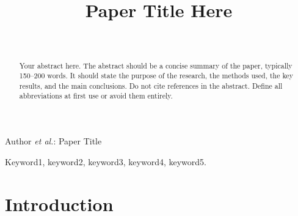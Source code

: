 \documentclass[journal]{IEEEtran}
\begin{document}
\title{Paper Title Here}

\author{%
  \\
}

%
{Author \MakeLowercase{\textit{et al.}}: Paper Title}

\maketitle

\begin{abstract}
Your abstract here. The abstract should be a concise summary of the
paper, typically 150--200 words. It should state the purpose of the
research, the methods used, the key results, and the main conclusions.
Do not cite references in the abstract. Define all abbreviations at
first use or avoid them entirely.
\end{abstract}

\begin{IEEEkeywords}
Keyword1, keyword2, keyword3, keyword4, keyword5.
\end{IEEEkeywords}

\section{Introduction}
\end{document}
